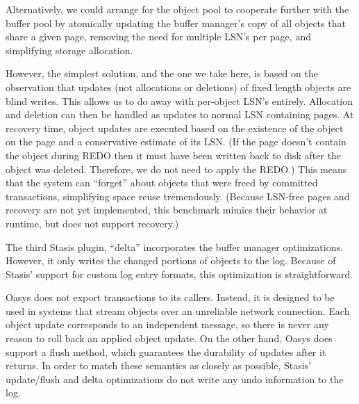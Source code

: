 \documentclass[letterpaper,twocolumn,10pt]{article}
\newcommand{\yad}{Stasis\xspace}
\newcommand{\yads}{Stasis'\xspace}
\newcommand{\oasys}{Oasys\xspace}
\begin{document}
Alternatively, we could arrange for the object pool to cooperate 
further with the buffer pool by atomically updating the buffer 
manager's copy of all objects that share a given page, removing the 
need for multiple LSN's per page, and simplifying storage allocation.

However, the simplest solution, and the one we take here, is based on the observation that
updates (not allocations or deletions) of fixed length objects are blind writes.
This allows us to do away with per-object LSN's entirely.  Allocation and deletion can then be handled
as updates to normal LSN containing pages.  At recovery time, object
updates are executed based on the existence of the object on the page
and a conservative estimate of its LSN.  (If the page doesn't contain
the object during REDO then it must have been written back to disk
after the object was deleted.  Therefore, we do not need to apply the
REDO.)  This means that the system can ``forget'' about objects that 
were freed by committed transactions, simplifying space reuse 
tremendously.  (Because LSN-free pages and recovery are not yet implemented, 
this benchmark mimics their behavior at runtime, but does not support recovery.) 

The third \yad plugin, ``delta'' incorporates the buffer
manager optimizations.  However, it only writes the changed portions of
objects to the log.  Because of \yads support for custom log entry
formats, this optimization is straightforward.

%

\oasys does not export transactions to its callers.  Instead, it
is designed to be used in systems that stream objects over an
unreliable network connection.  Each object update corresponds to an
independent message, so there is never any reason to roll back an
applied object update.  On the other hand, \oasys does support a
flush method, which guarantees the durability of updates after it
returns.  In order to match these semantics as closely as possible,
\yads update/flush and delta optimizations do not write any 
undo information to the log.  
\end{document}
